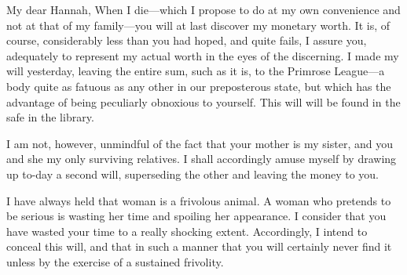




\begin{mail}{}{My dear Hannah,}
	When I die—which I propose to do at my own convenience and not at that of my family—you will at last discover my monetary worth. It is, of course, considerably less than you had hoped, and quite fails, I assure you, adequately to represent my actual worth in the eyes of the discerning. I made my will yesterday, leaving the entire sum, such as it is, to the Primrose League—a body quite as fatuous as any other in our preposterous state, but which has the advantage of being peculiarly obnoxious to yourself. This will will be found in the safe in the library.

I am not, however, unmindful of the fact that your mother is my sister, and you and she my only surviving relatives. I shall accordingly amuse myself by drawing up to-day a second will, superseding the other and leaving the money to you.

I have always held that woman is a frivolous animal. A woman who pretends to be serious is wasting her time and spoiling her appearance. I consider that you have wasted your time to a really shocking extent. Accordingly, I intend to conceal this will, and that in such a manner that you will certainly never find it unless by the exercise of a sustained frivolity.
	
\end{mail}

